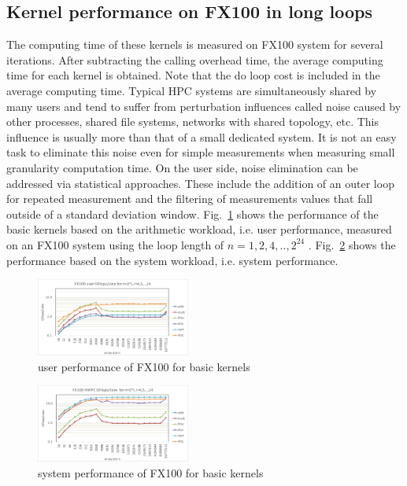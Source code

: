 \documentclass[conference]{IEEEtran}
\begin{document}
\subsection{Kernel performance on FX100 in long loops}
\label{subsection:long-kernels-fx100}
%
%
The computing time of these kernels is measured on FX100 system
for several iterations.
After subtracting the calling overhead time,
the average computing time for each kernel is obtained.
Note that the do loop cost is included in the average computing time.
%
%
Typical HPC systems are simultaneously shared by many users and tend to
suffer from perturbation influences called noise caused by other processes,
shared file systems, networks with shared topology, etc.
This influence is usually more than that of a small dedicated system.
It is not an easy task to eliminate this noise even for simple measurements 
when measuring small granularity computation time.
On the user side, noise elimination can be addressed via statistical
approaches. These include the addition of an outer loop for repeated
measurement and the filtering of measurements values that fall outside of
a standard deviation window.
\fi
%
%
Fig.~\ref{fig:fx100-gflops-user-long-R8} shows the 
performance of the basic kernels based on the arithmetic workload,
i.e. user performance,
measured on an FX100 system using the loop length of
\begin{math}
n=1,2,4,..,2^{24}
\end{math}
.
Fig.~\ref{fig:fx100-gflops-system-long-R8} shows the 
performance based on the system workload, i.e. system performance.

\begin{figure}[b]
\centering
\includegraphics[width=0.45\textwidth]{figs/fx100-gflops-user-long-R8.pdf}
\caption{user performance of FX100 for basic kernels}
\label{fig:fx100-gflops-user-long-R8}
\end{figure}

\begin{figure}[tb]
\centering
\includegraphics[width=0.45\textwidth]{figs/fx100-gflops-system-long-R8.pdf}
\caption{system performance of FX100 for basic kernels}
\label{fig:fx100-gflops-system-long-R8}
\end{figure}
\end{document}
